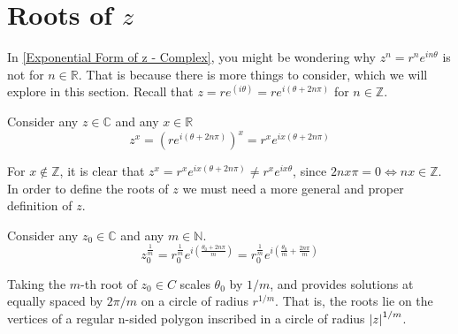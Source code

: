 \documentclass[12pt, english]{book}
\begin{document}
	\section{Roots of $z$} \label{Roots of z Sections - Complex}
	In \cref{Exponential Form of z - Complex}, you might be wondering why $z^n = r^n e^{i n \theta}$ is not for $n \in \mathbb{R}$. That is because there is more things to consider, which we will explore in this section. Recall that $z = re^(i \theta) = re^{i (\theta + 2n \pi)}$ for $n \in \mathbb{Z}$. 
	
	\begin{definition}[Exponential of $z$]
		Consider any $z \in \mathbb{C}$ and any $x \in \mathbb{R}$
		$$z^x = \left(r e^{i(\theta + 2 n \pi)} \right)^x = r^x e^{i x(\theta + 2n \pi)}$$
		\label{Exponential of z Definiion - Complex}
	\end{definition}

	For $x \nin \mathbb{Z}$, it is clear that $z^x =  r^x e^{ix(\theta + 2 n \pi)} \neq r^x e^{ix\theta}$, since $2nx\pi = 0 \iff nx \in \mathbb{Z}$. In order to define the roots of $z$ we must need a more general and proper definition of $z$.
	
	\begin{definition}[Roots of $z_0$]
		\label{Roots of z Definition - Complex}
		Consider any $z_0 \in \mathbb{C}$ and any $m \in \mathbb{N}$.
		$$z_0^{\frac{1}{m}} = r_0^\frac{1}{m} e^{i\left(\frac{\theta_0 + 2n \pi}{m}\right)} = r_0^\frac{1}{m} e^{i \left(\frac{\theta_0}{m} + \frac{2n \pi}{m}\right)}$$
	\end{definition}  
	
	Taking the $m$-th root of $z_0 \in C$ scales $\theta_0$ by $1/m$, and provides solutions at equally spaced by $2\pi / m$ on a circle of radius $r^{1/m}$. That is, the roots lie on the vertices of a regular n-sided polygon inscribed in a circle of radius $\abs{z}^{1/m}$. 
	
\end{document}
